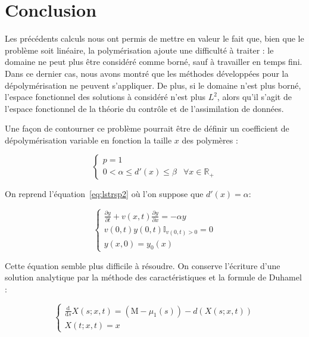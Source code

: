 \documentclass[a4paper]{article}
\theoremstyle{definition}
\theoremstyle{remark}
\newcommand{\mass}{\mathrm{M}}
\newcommand{\pol}{p}
\newcommand{\dep}{d}
\begin{document}
   

\section{Conclusion}

Les précédents calculs nous ont permis de mettre en valeur le fait que, bien que le problème soit linéaire, 
la polymérisation ajoute une difficulté à traiter : le domaine ne peut plus être considéré comme borné, sauf à travailler en temps 
fini. 
Dans ce dernier cas, nous avons montré que les méthodes développées pour la dépolymérisation ne peuvent s'appliquer.
De plus, si le domaine n'est plus borné, l'espace fonctionnel des solutions à considéré n'est plus $L^2$,
alors qu'il s'agit de l'espace fonctionnel de la théorie du contrôle et de l'assimilation de données.

Une façon de contourner ce problème pourrait être de définir un coefficient de dépolymérisation 
variable en fonction la taille $x$ des polymères :

\begin{equation}
	\label{coeff}
	\begin{cases}
		\pol = 1 \\
		0 < \alpha \leq \dep' (x) \leq \beta & \forall x \in \mathbb{R}_+ 
	\end{cases}
\end{equation}

On reprend l'équation~\eqref{eq:lstrsp2} où l'on suppose que $ \dep '(x) = \alpha $:

\begin{equation}
	\label{coeff}
	\begin{cases}
		\displaystyle \frac{\partial y}{\partial t}+ v(x,t)\frac{\partial y}{\partial x} = - \alpha y \\
		v(0,t)y(0,t)\mathbb{I}_{v(0,t) > 0} = 0 \\
		y(x,0) = y_0(x)
	\end{cases}
\end{equation}

Cette équation semble plus difficile à résoudre. On conserve l'écriture d'une solution analytique 
par la méthode des caractéristiques et la formule de Duhamel :

\[
\begin{cases}
\displaystyle \frac{\mathrm{d}}{\mathrm{d}s} X(s;x,t)= (\mass - \mu_1(s)) - \dep(X(s;x,t))\\
X(t;x,t) = x
\end{cases}
\]
\end{document}
